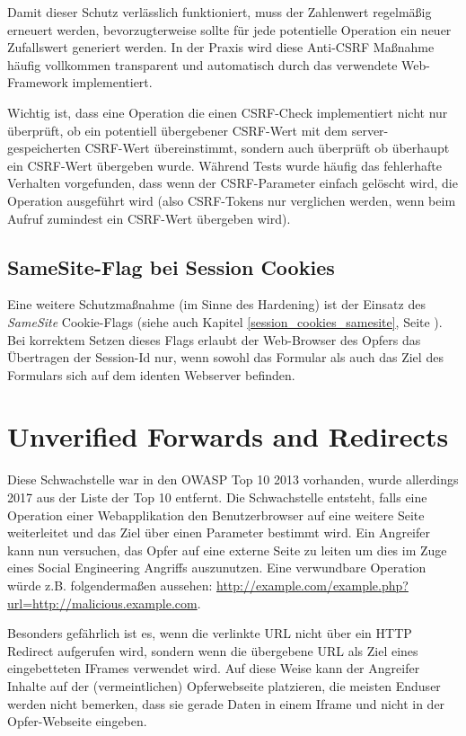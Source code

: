 Damit dieser Schutz verlässlich funktioniert, muss der Zahlenwert regelmäßig erneuert werden, bevorzugterweise sollte für jede potentielle Operation ein neuer Zufallswert generiert werden. In der Praxis wird diese Anti-CSRF Maßnahme häufig vollkommen transparent und automatisch durch das verwendete Web-Framework implementiert.

Wichtig ist, dass eine Operation die einen CSRF-Check implementiert nicht nur überprüft, ob ein potentiell übergebener CSRF-Wert mit dem server-gespeicherten CSRF-Wert übereinstimmt, sondern auch überprüft ob überhaupt ein CSRF-Wert übergeben wurde. Während Tests wurde häufig das fehlerhafte Verhalten vorgefunden, dass wenn der CSRF-Parameter einfach gelöscht wird, die Operation ausgeführt wird (also CSRF-Tokens nur verglichen werden, wenn beim Aufruf zumindest ein CSRF-Wert übergeben wird).

\subsection{SameSite-Flag bei Session Cookies}

Eine weitere Schutzmaßnahme (im Sinne des Hardening) ist der Einsatz des \textit{SameSite} Cookie-Flags (siehe auch Kapitel \ref{session_cookies_samesite}, Seite \pageref{session_cookies_samesite}). Bei korrektem Setzen dieses Flags erlaubt der Web-Browser des Opfers das Übertragen der Session-Id nur, wenn sowohl das Formular als auch das Ziel des Formulars sich auf dem identen Webserver befinden.

\section{Unverified Forwards and Redirects}

Diese Schwachstelle war in den OWASP Top 10 2013 vorhanden, wurde allerdings 2017 aus der Liste der Top 10 entfernt. Die Schwachstelle entsteht, falls eine Operation einer Webapplikation den Benutzerbrowser auf eine weitere Seite weiterleitet und das Ziel über einen Parameter bestimmt wird. Ein Angreifer kann nun versuchen, das Opfer auf eine externe Seite zu leiten um dies im Zuge eines Social Engineering Angriffs auszunutzen. Eine verwundbare Operation würde z.B. folgendermaßen aussehen: \url{http://example.com/example.php?url=http://malicious.example.com}.

Besonders gefährlich ist es, wenn die verlinkte URL nicht über ein HTTP Redirect aufgerufen wird, sondern wenn die übergebene URL als Ziel eines eingebetteten IFrames verwendet wird. Auf diese Weise kann der Angreifer Inhalte auf der (vermeintlichen) Opferwebseite platzieren, die meisten Enduser werden nicht bemerken, dass sie gerade Daten in einem Iframe und nicht in der Opfer-Webseite eingeben.

